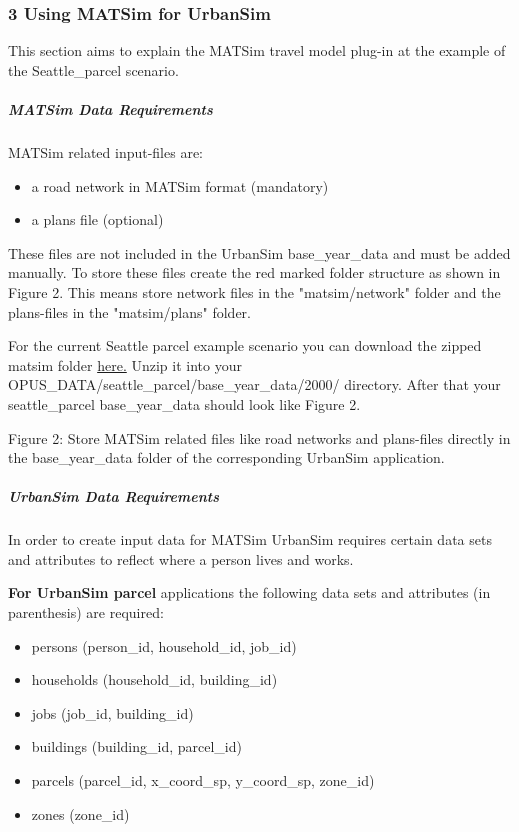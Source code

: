 \documentclass[a4paper,11pt]{report}
\begin{document}
\subsubsection{3 Using MATSim for UrbanSim}

This section aims to explain the MATSim travel model plug-in at the example of the Seattle\_parcel scenario.\textbf{}

\subparagraph{MATSim Data Requirements}

MATSim related input-files are:
\begin{itemize}
	\item a road network in MATSim format (mandatory)
	\item a plans file (optional)
\end{itemize}

These files are not included in the UrbanSim base\_year\_data and  must be added manually. To store these files create the red marked  folder structure as shown in Figure 2. This means store network files in  the "matsim/network" folder and the plans-files in the "matsim/plans"  folder.

For the current Seattle parcel example scenario you can download the zipped matsim folder \href{https://svn.vsp.tu-berlin.de/repos/public-svn/matsim/examples/countries/us/seattle/matsim.zip}{here.}  Unzip it into your OPUS\_DATA/seattle\_parcel/base\_year\_data/2000/  directory. After that your seattle\_parcel base\_year\_data should look  like Figure 2.



Figure 2: Store MATSim related files like road networks and  plans-files directly in the base\_year\_data folder of the corresponding  UrbanSim application.

\subparagraph{UrbanSim Data Requirements}

In order to create input data for MATSim UrbanSim requires certain  data sets and attributes to reflect where a person lives and works.

\textbf{For UrbanSim parcel} applications the following data sets and attributes (in parenthesis) are required:
\begin{itemize}
	\item persons (person\_id, household\_id, job\_id)
	\item households (household\_id, building\_id)
	\item jobs (job\_id, building\_id)
	\item buildings (building\_id, parcel\_id)
	\item parcels (parcel\_id, x\_coord\_sp, y\_coord\_sp, zone\_id)
	\item zones (zone\_id)
\end{itemize}
\end{document}
